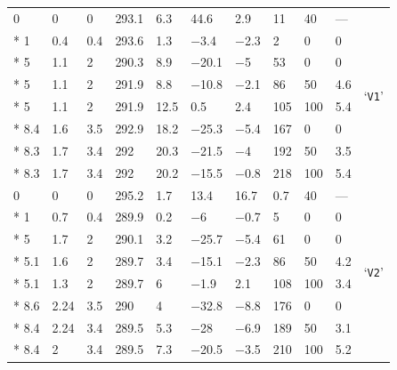 \begin{longtable}{llll llll lll}
	 \hdashline
	\num{0} & \num{0} & \num{0} & \num{293.1} & \num{6.3} & \num{44.6} & \num{2.9} & \num{11} & \num{40} & --- & \multirow{8}{*}{`\texttt{V1}'} \\*
	\num{1} & \num{.4} & \num{.4} & \num{293.6} & \num{1.3} & \num{-3.4} & \num{-2.3} & \num{2} & \num{0} & \num{0} & \\*
	\num{5} & \num{1.1} & \num{2} & \num{290.3} & \num{8.9} & \num{-20.1} & \num{-5} & \num{53} & \num{0} & \num{0} & \\*
	\num{5} & \num{1.1} & \num{2} & \num{291.9} & \num{8.8} & \num{-10.8} & \num{-2.1} & \num{86} & \num{50} & \num{4.6} & \\*
	\num{5} & \num{1.1} & \num{2} & \num{291.9} & \num{12.5} & \num{.5} & \num{2.4} & \num{105} & \num{100} & \num{5.4} & \\*
	\num{8.4} & \num{1.6} & \num{3.5} & \num{292.9} & \num{18.2} & \num{-25.3} & \num{-5.4} & \num{167} & \num{0} & \num{0} & \\*
	\num{8.3} & \num{1.7} & \num{3.4} & \num{292} & \num{20.3} & \num{-21.5} & \num{-4} & \num{192} & \num{50} & \num{3.5} & \\*
	\num{8.3} & \num{1.7} & \num{3.4} & \num{292} & \num{20.2} & \num{-15.5} & \num{-.8} & \num{218} & \num{100} & \num{5.4} & \\
	
	 \hdashline 
	\num{0} & \num{0} & \num{0} & \num{295.2} & \num{1.7} & \num{13.4} & \num{16.7} & \num{.7} & \num{40} & --- & \multirow{8}{*}{`\texttt{V2}'} \\*
	\num{1} & \num{.7} & \num{.4} & \num{289.9} & \num{.2} & \num{-6} & \num{-.7} & \num{5} & \num{0} & \num{0} & \\*
	\num{5} & \num{1.7} & \num{2} & \num{290.1} & \num{3.2} & \num{-25.7} & \num{-5.4} & \num{61} & \num{0} & \num{0} & \\*
	\num{5.1} & \num{1.6} & \num{2} & \num{289.7} & \num{3.4} & \num{-15.1} & \num{-2.3} & \num{86} & \num{50} & \num{4.2} & \\*
	\num{5.1} & \num{1.3} & \num{2} & \num{289.7} & \num{6} & \num{-1.9} & \num{2.1} & \num{108} & \num{100} & \num{3.4} & \\*
	\num{8.6} & \num{2.24} & \num{3.5} & \num{290} & \num{4} & \num{-32.8} & \num{-8.8} & \num{176} & \num{0} & \num{0} & \\*
	\num{8.4} & \num{2.24} & \num{3.4} & \num{289.5} & \num{5.3} & \num{-28} & \num{-6.9} & \num{189} & \num{50} & \num{3.1} & \\*
	\num{8.4} & \num{2} & \num{3.4} & \num{289.5} & \num{7.3} & \num{-20.5} & \num{-3.5} & \num{210} & \num{100} & \num{5.2} & \\


\end{longtable}
